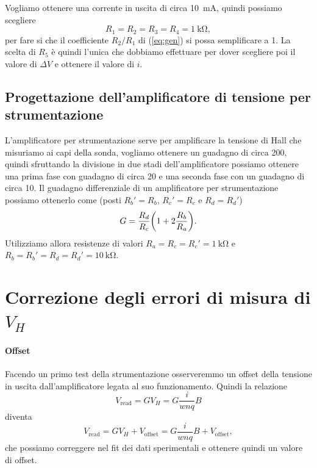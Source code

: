 \documentclass[fleqn,varvw]{memo}
\begin{document}
Vogliamo ottenere una corrente in uscita di circa \SI{10}{\milli\ampere}, quindi possiamo scegliere \[R_1=R_2=R_3=R_4=\SI{1}{\kilo\ohm},\] per fare si che il coefficiente $R_2/R_1$ di (\ref{eq:gen}) si possa semplificare a 1. La scelta di $R_5$ è quindi l'unica che dobbiamo effettuare per dover scegliere poi il valore di $\Delta V$ e ottenere il valore di $i$.

\subsection{Progettazione dell'amplificatore di tensione per strumentazione}

L'amplificatore per strumentazione serve per amplificare la tensione di Hall che misuriamo ai capi della sonda, vogliamo ottenere un guadagno di circa 200, quindi sfruttando la divisione in due stadi dell'amplificatore possiamo ottenere una prima fase con guadagno di circa 20 e una seconda fase con un guadagno di circa 10. Il guadagno differenziale di un amplificatore per strumentazione possiamo ottenerlo come (posti $R_b'=R_b$, $R_c'=R_c$ e $R_d=R_d'$)\begin{equation}
    G= \frac{R_d}{R_c}\qty(1+2\frac{R_b}{R_a}).\label{eq:gain_diff}
\end{equation} Utilizziamo allora resistenze di valori $R_a=R_c=R_c'=\SI{1}{\kilo\ohm}$ e $R_b=R_b'=R_d=R_d'=\SI{10}{\kilo\ohm}$.

\section{Correzione degli errori di misura di $V_H$}

\paragraph{Offset} Facendo un primo test della strumentazione osserveremmo un offset della tensione in uscita dall'amplificatore legata al suo funzionamento. Quindi la relazione \begin{equation}
    V_\text{read} = GV_H = G\frac{i}{wnq}B
\end{equation} diventa \begin{equation}
    V_\text{read} = GV_H + V_\text{offset} = G\frac{i}{wnq}B + V_\text{offset}\label{eq:offset},
\end{equation} che possiamo correggere nel fit dei dati sperimentali e ottenere quindi un valore di offset. 
\end{document}
